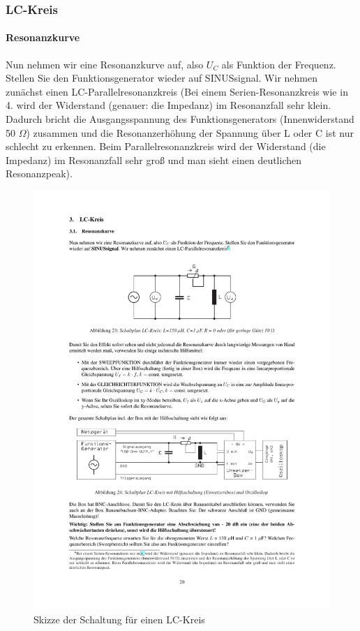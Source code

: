 \documentclass[12pt]{scrartcl}
\begin{document}
\subsubsection{LC-Kreis}
\paragraph{Resonanzkurve} 
Nun nehmen wir eine Resonanzkurve auf, also $U_C$ als Funktion der Frequenz. Stellen Sie den Funktionsgenerator wieder auf SINUSsignal. Wir nehmen zunächst einen LC-Parallelresonanzkreis (Bei einem Serien-Resonanzkreis wie in 4. wird der Widerstand (genauer: die Impedanz) im Resonanzfall sehr klein. Dadurch bricht die Ausgangsspannung des Funktionsgenerators (Innenwiderstand 50
$\Omega$) zusammen und die Resonanzerhöhung der Spannung über L oder C ist
nur schlecht zu erkennen. Beim Parallelresonanzkreis wird der Widerstand (die Impedanz) im Resonanzfall sehr groß und man sieht einen deutlichen Resonanzpeak).
\begin{figure}[htbp] 
  \centering
    \includegraphics[trim = 20mm 200mm 1mm 50mm, clip, scale = 1]{LC_kreis.pdf}
  	\caption[Skizze der Schaltung für einen LC-Kreis]{Skizze der Schaltung für einen LC-Kreis\footnotemark}
  \label{fig:LC-Kreis}
\end{figure}
\newpage
{}
\end{document}
